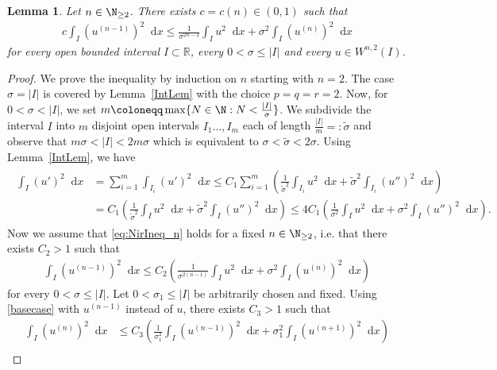 \documentclass{article}
\newcommand{\dd}{\mathop{}\mathrm{d}} %
\newcommand{\tils}{\tilde{\sigma}}
\numberwithin{figure}{section}
\newcommand{\R}{\mathbb{R}}
\newtheorem{lemma}[theorem]{Lemma}
\numberwithin{equation}{section}
\begin{document}
\begin{lemma} \label{Lemma:NirIneq_n}
Let $n \in \N_{\geq2}$. There exists $c = c(n) \in (0,1)$ such that
    \begin{align} \label{eq:NirIneq_n}
        c \int_I (u^{(n-1)})^2\dd x \leq \frac 1{\sigma^{2n-2}} \int_I u^2\dd x + \sigma^2 \int_I (u^{(n)})^2\dd x
    \end{align}
for every open bounded interval $I \subset \R$, every $0 < \sigma \leq |I|$ and every $u \in W^{n,2}(I)$.
\end{lemma}

\begin{proof}
    We prove the inequality by induction on $n$ starting with $n = 2$. The case $\sigma = |I|$ is covered by Lemma~\ref{IntLem} with the choice $p = q = r = 2$. Now, for $0 < \sigma < |I|$, we set $m \coloneqq \max\{N \in \N: N < \frac{|I|}{\sigma}\}$. We subdivide the interval $I$ into $m$ disjoint open intervals $I_1\ldots,I_m$ each of length $\frac{|I|}{m}=:\tils$ and observe that $m\sigma < |I| < 2m \sigma$ which is equivalent to $\sigma < \tils < 2 \sigma$. Using Lemma~\ref{IntLem}, we have
    \begin{align} \label{basecase}
    \begin{split}
        \int_I (u')^2\dd x & = \sum_{i=1}^m \int_{I_i} (u')^2\dd x
        \leq C_1 \sum_{i=1}^m \left(\frac {1}{\tils^2} \int_{I_i} u^2\dd x + \tils^2 \int_{I_i} (u'')^2\dd x \right)\\
        & = C_1 \left(\frac {1}{\tils^2} \int_{I} u^2\dd x + \tils^2 \int_{I} (u'')^2\dd x \right) 
        \leq 4C_1 \left(\frac {1}{\sigma^2} \int_{I} u^2\dd x + \sigma^2 \int_{I} (u'')^2\dd x \right).
    \end{split}
    \end{align}
    Now we assume that \eqref{eq:NirIneq_n} holds for a fixed $n \in \N_{\geq2}$, i.e. that there exists $C_2>1$ such that
    \begin{align} \label{Nir_IA}
    \int_I (u^{(n-1)})^2\dd x \leq C_2 \left(\frac 1{\sigma^{2(n-1)}} \int_I u^2\dd x + \sigma^2 \int_I (u^{(n)})^2\dd x\right)
    \end{align}
    for every $0 < \sigma \leq |I|$. Let $0< \sigma_1 \leq |I|$ be arbitrarily chosen and fixed. Using \eqref{basecase} with $u^{(n-1)}$ instead of $u$, there exists $C_3>1$ such that
    \begin{align}
        \int_I (u^{(n)})^2\dd x & \leq C_3 \left(\frac 1{\sigma_1^2} \int_I (u^{(n-1)})^2\dd x + \sigma_1^2 \int_I (u^{(n+1)})^2\dd x\right)\\

\end{align}
\end{proof}
\end{document}
